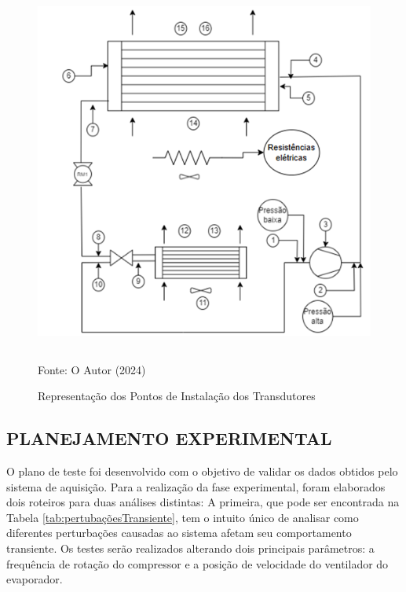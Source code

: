 \begin{figure}[ht]
    \centering
     \caption{Representação dos Pontos de Instalação dos Transdutores}
    \includegraphics[width=11.75cm, height=11.88cm]{FigurasdoTexto/Instalação Transdutores.png}
    \vspace{5pt}  %
    
    {\footnotesize Fonte: O Autor (2024)}  %
    \label{fig:instalação transdutores}
\end{figure}
\newpage
\subsection{PLANEJAMENTO EXPERIMENTAL}

O plano de teste foi desenvolvido com o objetivo de validar os dados obtidos pelo sistema de aquisição. Para a realização da fase experimental, foram elaborados dois roteiros para duas análises distintas: A primeira, que pode ser encontrada na Tabela \ref{tab:pertubaçõesTransiente}, tem o intuito único de analisar como diferentes perturbações causadas ao sistema afetam seu comportamento transiente. Os testes serão realizados alterando dois principais parâmetros: a frequência de rotação do compressor e a posição de velocidade do ventilador do evaporador.

